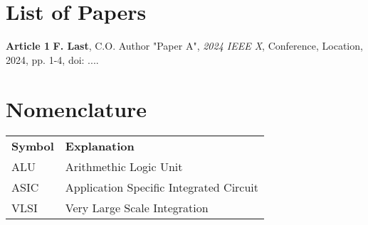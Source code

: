 \tableofcontents
{}

\chapter*{List of Papers}

\textbf{Article 1}
\newline
\textbf{F. Last}, C.O. Author "Paper A", \textit{2024 IEEE X}, Conference, Location, 2024, pp. 1-4, doi: ....

\listoffigures 
{}

\listoftables  
{}

\lstlistoflistings
{}

\chapter*{Nomenclature}
\label{sec:nomenclature}

\begin{longtable}{ll}
  \textbf{Symbol} & \textbf{Explanation}\endhead\\
  ALU & Arithmethic Logic Unit \\
  ASIC & Application Specific Integrated Circuit \\
  VLSI & Very Large Scale Integration \\
\end{longtable}

